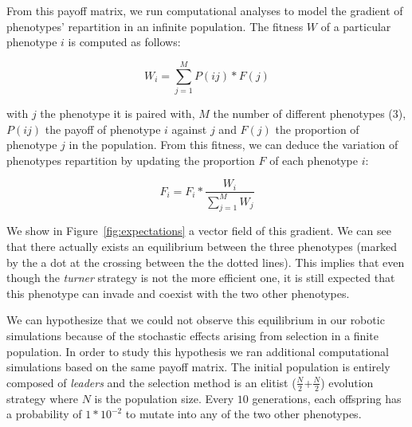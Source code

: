 
  From this payoff matrix, we run computational analyses to model the gradient of phenotypes' repartition in an infinite population. The fitness \(W\) of a particular phenotype \(i\) is computed as follows:

  \[
    W_{i} = \sum_{j=1}^{M} P(ij)*F(j)
  \]

  with \(j\) the phenotype it is paired with, \(M\) the number of different phenotypes ($3$), \(P(ij)\) the payoff of phenotype \(i\) against \(j\) and \(F(j)\) the proportion of phenotype \(j\) in the population. From this fitness, we can deduce the variation of phenotypes repartition by updating the proportion \(F\) of each phenotype \(i\): 

  \[
    F_{i} = F_{i}*\frac{W_{i}}{\sum_{j=1}^{M} W_{j}}
  \]

  We show in Figure~\ref{fig:expectations} a vector field of this gradient. We can see that there actually exists an equilibrium between the three phenotypes (marked by the a dot at the crossing between the the dotted lines). This implies that even though the \emph{turner} strategy is not the more efficient one, it is still expected that this phenotype can invade and coexist with the two other phenotypes.

  We can hypothesize that we could not observe this equilibrium in our robotic simulations because of the stochastic effects arising from selection in a finite population. In order to study this hypothesis we ran additional computational simulations based on the same payoff matrix. The initial population is entirely composed of \emph{leaders} and the selection method is an elitist (\(\frac{N}{2}\)+\(\frac{N}{2}\)) evolution strategy where \(N\) is the population size. Every $10$ generations, each offspring has a probability of \(1*10^{-2}\) to mutate into any of the two other phenotypes.

